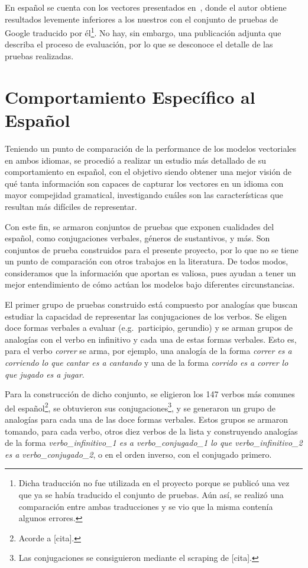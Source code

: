 En español se cuenta con los vectores presentados en~\cite{SBWCE}, donde el autor obtiene resultados
levemente inferiores a los nuestros con el conjunto de pruebas de Google traducido por
él\footnote{Dicha traducción no fue utilizada en el proyecto porque se publicó una vez que ya se
había traducido el conjunto de pruebas. Aún así, se realizó una comparación entre ambas traducciones
y se vio que la misma contenía algunos errores.}. No hay, sin embargo, una publicación adjunta que
describa el proceso de evaluación, por lo que se desconoce el detalle de las pruebas realizadas.


\section{Comportamiento Específico al Español}

Teniendo un punto de comparación de la performance de los modelos vectoriales en ambos idiomas, se
procedió a realizar un estudio más detallado de su comportamiento en español, con el objetivo siendo
obtener una mejor visión de qué tanta información son capaces de capturar los vectores en un idioma
con mayor compejidad gramatical, investigando cuáles son las características que resultan más
difíciles de representar.

Con este fin, se armaron conjuntos de pruebas que exponen cualidades del español, como conjugaciones
verbales, géneros de sustantivos, y más. Son conjuntos de prueba construidos para el presente
proyecto, por lo que no se tiene un punto de comparación con otros trabajos en la literatura. De
todos modos, consideramos que la información que aportan es valiosa, pues ayudan a tener un mejor
entendimiento de cómo actúan los modelos bajo diferentes circunstancias.


El primer grupo de pruebas construido está compuesto por analogías que buscan estudiar la capacidad
de representar las conjugaciones de los verbos. Se eligen doce formas verbales a evaluar
(e.g.\ participio, gerundio) y se arman grupos de analogías con el verbo en infinitivo y cada una de
estas formas verbales. Esto es, para el verbo \textit{correr} se arma, por ejemplo, una analogía de
la forma \textit{correr es a corriendo lo que cantar es a cantando} y una de la forma
\textit{corrido es a correr lo que jugado es a jugar}.

Para la construcción de dicho conjunto, se eligieron los 147 verbos más comunes del
español\footnote{Acorde a [cita].}, se obtuvieron sus conjugaciones\footnote{Las conjugaciones se
consiguieron mediante el scraping de [cita].}, y se generaron un grupo de analogías para cada una de
las doce formas verbales. Estos grupos se armaron tomando, para cada verbo, otros diez verbos de la
lista y construyendo analogías de la forma \textit{verbo\_infinitivo\_1 es a verbo\_conjugado\_1 lo
que verbo\_infinitivo\_2 es a verbo\_conjugado\_2}, o en el orden inverso, con el conjugado primero.

